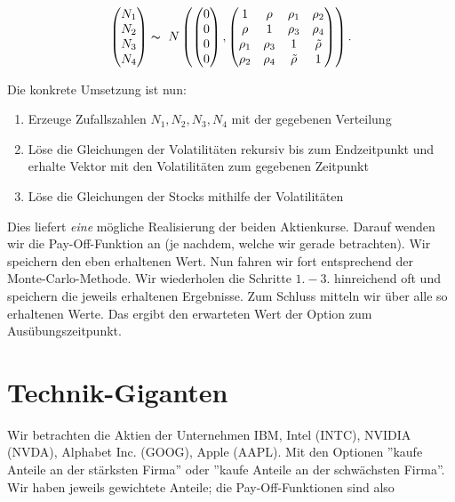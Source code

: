 \documentclass[12pt]{article}
\begin{document}
\begin{align*}
\left(\begin{matrix}
N_1\\N_2\\N_3\\N_4
\end{matrix}\right)
\thicksim \
N\left(
\left(\begin{matrix}
0\\0\\0\\0
\end{matrix}\right),
\left(\begin{matrix}
1& \rho& \rho_1& \rho_2\\
\rho& 1& \rho_3& \rho_4\\
\rho_1& \rho_3& 1& \tilde{\rho}\\
\rho_2& \rho_4& \tilde{\rho}& 1
\end{matrix}\right)
\right).
\end{align*}

Die konkrete Umsetzung ist nun:
\begin{enumerate}
\item Erzeuge Zufallszahlen $N_1, N_2, N_3, N_4$ mit der gegebenen Verteilung
\item Löse die Gleichungen der Volatilitäten rekursiv bis zum Endzeitpunkt und erhalte Vektor mit den Volatilitäten zum gegebenen Zeitpunkt
\item Löse die Gleichungen der Stocks mithilfe der Volatilitäten
\end{enumerate}

Dies liefert \textit{eine} mögliche Realisierung der beiden Aktienkurse. Darauf wenden wir die Pay-Off-Funktion an (je nachdem, welche wir gerade betrachten). Wir speichern den eben erhaltenen Wert.
Nun fahren wir fort entsprechend der Monte-Carlo-Methode. Wir wiederholen die Schritte $1.-3.$ hinreichend oft und speichern die jeweils erhaltenen Ergebnisse. Zum Schluss mitteln wir über alle so erhaltenen Werte. Das ergibt den erwarteten Wert der Option zum Ausübungszeitpunkt.


\section{Technik-Giganten}

Wir betrachten die Aktien der Unternehmen IBM, Intel (INTC), NVIDIA (NVDA), Alphabet Inc. (GOOG), Apple (AAPL). Mit den Optionen ''kaufe Anteile an der stärksten Firma'' oder ''kaufe Anteile an der schwächsten Firma''. Wir haben jeweils gewichtete Anteile; die Pay-Off-Funktionen sind also
\end{document}
